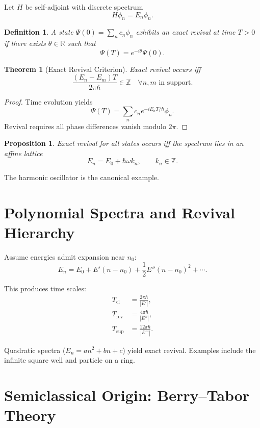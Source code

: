 \documentclass[11pt]{article}
\newtheorem{theorem}{Theorem}
\newtheorem{definition}{Definition}
\newtheorem{proposition}{Proposition}
\begin{document}
Let $H$ be self-adjoint with discrete spectrum
\[
H\phi_n = E_n \phi_n.
\]

\begin{definition}
A state $\Psi(0)=\sum_n c_n \phi_n$ exhibits an exact revival at time $T>0$
if there exists $\theta\in\mathbb{R}$ such that
\[
\Psi(T)=e^{-i\theta}\Psi(0).
\]
\end{definition}

\begin{theorem}[Exact Revival Criterion]
Exact revival occurs iff
\[
\frac{(E_n - E_m)T}{2\pi\hbar}\in\mathbb{Z}
\quad
\forall n,m \text{ in support}.
\]
\end{theorem}

\begin{proof}
Time evolution yields
\[
\Psi(T)=\sum_n c_n e^{-iE_n T/\hbar}\phi_n.
\]
Revival requires all phase differences vanish modulo $2\pi$.
\end{proof}

\begin{proposition}
Exact revival for all states occurs iff the spectrum lies in an affine lattice
\[
E_n = E_0 + \hbar\omega k_n, \qquad k_n\in\mathbb{Z}.
\]
\end{proposition}

The harmonic oscillator is the canonical example.

\section{Polynomial Spectra and Revival Hierarchy}

Assume energies admit expansion near $n_0$:
\[
E_n = E_0 + E'(n-n_0) + \frac12 E''(n-n_0)^2 + \cdots.
\]

This produces time scales:
\begin{align}
T_{\mathrm{cl}} &= \frac{2\pi\hbar}{|E'|}, \\
T_{\mathrm{rev}} &= \frac{4\pi\hbar}{|E''|}, \\
T_{\mathrm{sup}} &= \frac{12\pi\hbar}{|E'''|}.
\end{align}

Quadratic spectra ($E_n=an^2+bn+c$) yield exact revival.
Examples include the infinite square well and particle on a ring.

\section{Semiclassical Origin: Berry--Tabor Theory}
\end{document}
